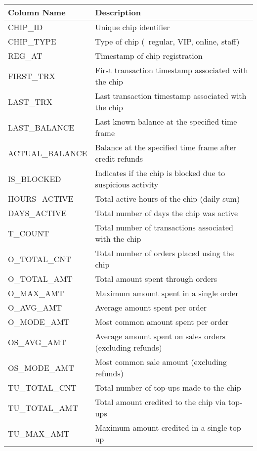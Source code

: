 \begin{table}[htbp]
	\centering
	\footnotesize
	\begin{tabularx}{\textwidth}{|>{\columncolor{unicorn_blue!5}}X|>{\columncolor{unicorn_blue!5}}l|}
		\hline
		\rowcolor{unicorn_blue}
		\textbf{\color{white} Column Name} & \textbf{\color{white} Description} \\
		\hline
		\hline
		CHIP\_ID & Unique chip identifier \\
		CHIP\_TYPE & Type of chip (\eg~regular, VIP, online, staff) \\
		REG\_AT & Timestamp of chip registration \\
		FIRST\_TRX & First transaction timestamp associated with the chip \\
		LAST\_TRX & Last transaction timestamp associated with the chip \\
		LAST\_BALANCE & Last known balance at the specified time frame \\
		ACTUAL\_BALANCE & Balance at the specified time frame after credit refunds \\
		\hline
		IS\_BLOCKED & Indicates if the chip is blocked due to suspicious activity \\
		HOURS\_ACTIVE & Total active hours of the chip (daily sum) \\
		DAYS\_ACTIVE & Total number of days the chip was active \\
		\hline
		T\_COUNT & Total number of transactions associated with the chip \\
		O\_TOTAL\_CNT & Total number of orders placed using the chip \\
		O\_TOTAL\_AMT & Total amount spent through orders \\
		O\_MAX\_AMT & Maximum amount spent in a single order \\
		O\_AVG\_AMT & Average amount spent per order \\
		O\_MODE\_AMT & Most common amount spent per order \\
		OS\_AVG\_AMT & Average amount spent on sales orders (excluding refunds) \\
		OS\_MODE\_AMT & Most common sale amount (excluding refunds) \\
		TU\_TOTAL\_CNT & Total number of top-ups made to the chip \\
		TU\_TOTAL\_AMT & Total amount credited to the chip via top-ups \\
		TU\_MAX\_AMT & Maximum amount credited in a single top-up \\

\end{tabularx}
\end{table}

